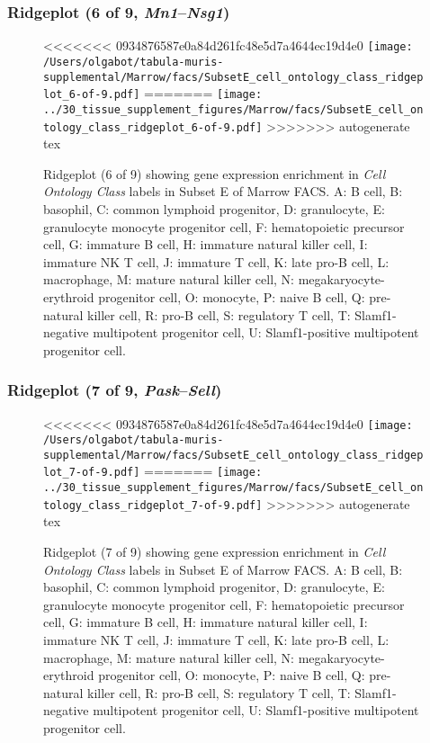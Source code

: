 \clearpage

\subsubsection{Ridgeplot (6 of 9, \emph{Mn1}--\emph{Nsg1})}
\begin{figure}[h]
\centering
<<<<<<< 0934876587e0a84d261fc48e5d7a4644ec19d4e0
\texttt{[image: /Users/olgabot/tabula-muris-supplemental/Marrow/facs/SubsetE\_cell\_ontology\_class\_ridgeplot\_6-of-9.pdf]}
=======
\texttt{[image: ../30\_tissue\_supplement\_figures/Marrow/facs/SubsetE\_cell\_ontology\_class\_ridgeplot\_6-of-9.pdf]}
>>>>>>> autogenerate tex

\caption{ Ridgeplot (6 of 9)  showing gene expression enrichment in \emph{Cell Ontology Class} labels in Subset E of Marrow FACS. A: B cell, B: basophil, C: common lymphoid progenitor, D: granulocyte, E: granulocyte monocyte progenitor cell, F: hematopoietic precursor cell, G: immature B cell, H: immature natural killer cell, I: immature NK T cell, J: immature T cell, K: late pro-B cell, L: macrophage, M: mature natural killer cell, N: megakaryocyte-erythroid progenitor cell, O: monocyte, P: naive B cell, Q: pre-natural killer cell, R: pro-B cell, S: regulatory T cell, T: Slamf1-negative multipotent progenitor cell, U: Slamf1-positive multipotent progenitor cell.}
\end{figure}


\clearpage

\subsubsection{Ridgeplot (7 of 9, \emph{Pask}--\emph{Sell})}
\begin{figure}[h]
\centering
<<<<<<< 0934876587e0a84d261fc48e5d7a4644ec19d4e0
\texttt{[image: /Users/olgabot/tabula-muris-supplemental/Marrow/facs/SubsetE\_cell\_ontology\_class\_ridgeplot\_7-of-9.pdf]}
=======
\texttt{[image: ../30\_tissue\_supplement\_figures/Marrow/facs/SubsetE\_cell\_ontology\_class\_ridgeplot\_7-of-9.pdf]}
>>>>>>> autogenerate tex

\caption{ Ridgeplot (7 of 9)  showing gene expression enrichment in \emph{Cell Ontology Class} labels in Subset E of Marrow FACS. A: B cell, B: basophil, C: common lymphoid progenitor, D: granulocyte, E: granulocyte monocyte progenitor cell, F: hematopoietic precursor cell, G: immature B cell, H: immature natural killer cell, I: immature NK T cell, J: immature T cell, K: late pro-B cell, L: macrophage, M: mature natural killer cell, N: megakaryocyte-erythroid progenitor cell, O: monocyte, P: naive B cell, Q: pre-natural killer cell, R: pro-B cell, S: regulatory T cell, T: Slamf1-negative multipotent progenitor cell, U: Slamf1-positive multipotent progenitor cell.}
\end{figure}


